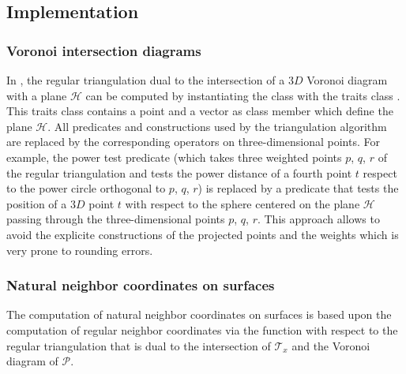 \subsection{Implementation}
\subsubsection{Voronoi intersection diagrams}


In \cgal, the regular triangulation dual to the intersection of a $3D$
Voronoi diagram with a plane $\mathcal{H}$ can be computed by
instantiating the  class with
the traits class . This traits
class contains a point and a vector as class member which define the
plane $\mathcal{H}$. All predicates and constructions used by the
triangulation algorithm are replaced by the corresponding operators on
three-dimensional points. For example, the power test predicate (which
takes three weighted points $p$, $q$, $r$ of the regular triangulation
and tests the power distance of a fourth point $t$ respect to the
power circle orthogonal to $p$, $q$, $r$) is replaced by a
 predicate that tests the
position of a $3D$ point $t$ with respect to the sphere centered on
the plane $\mathcal{H}$ passing through the three-dimensional points
$p$, $q$, $r$.  This approach allows to avoid the explicite
constructions of the projected points and the weights which is very
prone to rounding errors.

\subsubsection{Natural neighbor coordinates on surfaces}

The computation of natural neighbor coordinates on surfaces is based
upon the computation of regular neighbor coordinates via the function
 with respect to the regular
triangulation that is dual to the intersection of $\mathcal{T}_x$ and
the Voronoi diagram of $\mathcal{P}$.

